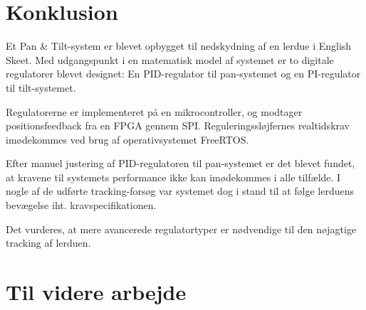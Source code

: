 \section{Konklusion}
\label{sec:konklusion}
Et Pan \& Tilt-system er blevet opbygget til nedskydning af en lerdue i English Skeet.
Med udgangspunkt i en matematisk model af systemet er to digitale regulatorer
blevet designet: En PID-regulator til pan-systemet og en PI-regulator til tilt-systemet.

Regulatorerne er implementeret på en mikrocontroller, og modtager positionsfeedback
fra en FPGA gennem SPI.
Reguleringssløjfernes realtidskrav imødekommes ved brug af operativsystemet FreeRTOS.

Efter manuel justering af PID-regulatoren til pan-systemet er det blevet fundet,
at kravene til systemets performance ikke kan imødekommes i alle tilfælde.
I nogle af de udførte tracking-forsøg var systemet dog i stand til at følge lerduens bevægelse
iht. kravspecifikationen.

Det vurderes, at mere avancerede regulatortyper er nødvendige til den nøjagtige tracking af lerduen.

\section{Til videre arbejde}